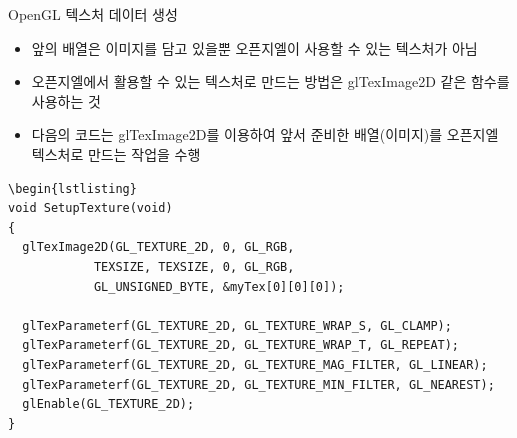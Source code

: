 \documentclass{beamer}
\begin{document}
\begin{frame}[fragile]{OpenGL 텍스처 데이터 생성}

\begin{itemize}
\item 앞의 배열은 이미지를 담고 있을뿐 오픈지엘이 사용할 수 있는 텍스처가 아님
\item 오픈지엘에서 활용할 수 있는 텍스처로 만드는 방법은 {\sf glTexImage2D} 같은 함수를 사용하는 것
\item 다음의 코드는 {\sf glTexImage2D}를 이용하여 앞서 준비한 배열(이미지)를 오픈지엘 텍스처로 만드는 작업을 수행
\end{itemize}

\lstset{language=C++, escapechar=^} 
\begin{lstlisting}
\begin{lstlisting}
void SetupTexture(void) 
{
  glTexImage2D(GL_TEXTURE_2D, 0, GL_RGB, 
            TEXSIZE, TEXSIZE, 0, GL_RGB, 
            GL_UNSIGNED_BYTE, &myTex[0][0][0]);
	
  glTexParameterf(GL_TEXTURE_2D, GL_TEXTURE_WRAP_S, GL_CLAMP);
  glTexParameterf(GL_TEXTURE_2D, GL_TEXTURE_WRAP_T, GL_REPEAT);
  glTexParameterf(GL_TEXTURE_2D, GL_TEXTURE_MAG_FILTER, GL_LINEAR);
  glTexParameterf(GL_TEXTURE_2D, GL_TEXTURE_MIN_FILTER, GL_NEAREST);
  glEnable(GL_TEXTURE_2D);
}
\end{lstlisting}

\end{frame}
\end{document}
